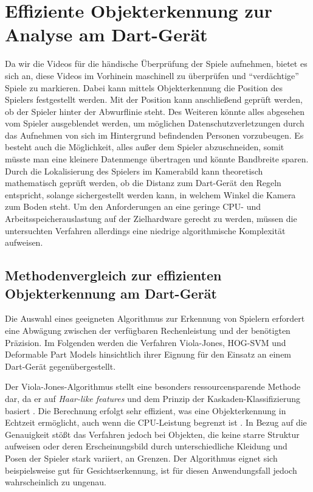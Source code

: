         
\section{Effiziente Objekterkennung zur Analyse am Dart-Gerät}

Da wir die Videos für die händische Überprüfung der Spiele aufnehmen, bietet es sich an, diese Videos im Vorhinein maschinell zu überprüfen und \enquote{verdächtige} Spiele zu markieren. Dabei kann mittels Objekterkennung 
die Position des Spielers festgestellt werden. Mit der Position kann anschließend geprüft werden, ob der Spieler hinter der Abwurflinie steht. Des Weiteren könnte alles abgesehen vom Spieler ausgeblendet werden, 
um möglichen Datenschutzverletzungen durch das Aufnehmen von sich im Hintergrund befindenden Personen vorzubeugen. Es besteht auch die Möglichkeit, alles außer dem Spieler abzuschneiden, somit müsste man eine kleinere Datenmenge übertragen und könnte Bandbreite sparen.
Durch die Lokalisierung des Spielers im Kamerabild kann theoretisch mathematisch geprüft werden, ob die Distanz zum Dart-Gerät den Regeln entspricht, solange sichergestellt werden kann, in welchem Winkel die Kamera zum Boden steht. 
Um den Anforderungen an eine geringe CPU- und Arbeitsspeicherauslastung auf der Zielhardware gerecht zu werden, müssen die untersuchten Verfahren allerdings eine niedrige algorithmische Komplexität aufweisen.\newline

\subsection{Methodenvergleich zur effizienten Objekterkennung am Dart-Gerät}

Die Auswahl eines geeigneten Algorithmus zur Erkennung von Spielern erfordert eine Abwägung zwischen der verfügbaren Rechenleistung und der benötigten Präzision. Im Folgenden werden die Verfahren Viola-Jones, 
HOG-SVM und Deformable Part Models hinsichtlich ihrer Eignung für den Einsatz an einem Dart-Gerät gegenübergestellt.\newline

Der Viola-Jones-Algorithmus stellt eine besonders ressourcensparende Methode dar, da er auf \textit{Haar-like features} und dem Prinzip der Kaskaden-Klassifizierung basiert \parencite{ipol.2014.104}. Die Berechnung erfolgt sehr effizient, 
was eine Objekterkennung in Echtzeit ermöglicht, auch wenn die CPU-Leistung begrenzt ist \parencite{ipol.2014.104}. In Bezug auf die Genauigkeit stößt das Verfahren jedoch bei Objekten, die keine starre Struktur aufweisen oder deren 
Erscheinungsbild durch unterschiedliche Kleidung und Posen der Spieler stark variiert, an Grenzen. Der Algorithmus eignet sich beispielsweise gut für Gesichtserkennung, ist  für diesen Anwendungsfall jedoch wahrscheinlich zu ungenau.\newline

